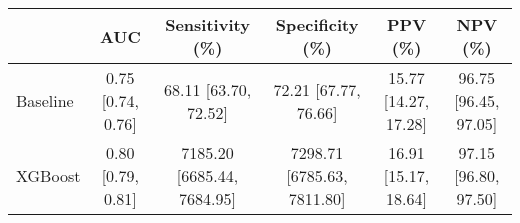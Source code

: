 \begin{tabular}{l|ccccc}
\toprule
 & AUC & Sensitivity (\%) & Specificity (\%) & PPV (\%) & NPV (\%) \\
\midrule
Baseline &  0.75 [0.74, 0.76] &  68.11 [63.70, 72.52] &  72.21 [67.77, 76.66] &  15.77 [14.27, 17.28] &  96.75 [96.45, 97.05] \\
XGBoost &  0.80 [0.79, 0.81] &  7185.20 [6685.44, 7684.95] &  7298.71 [6785.63, 7811.80] &  16.91 [15.17, 18.64] &  97.15 [96.80, 97.50] \\
\bottomrule
\end{tabular}
